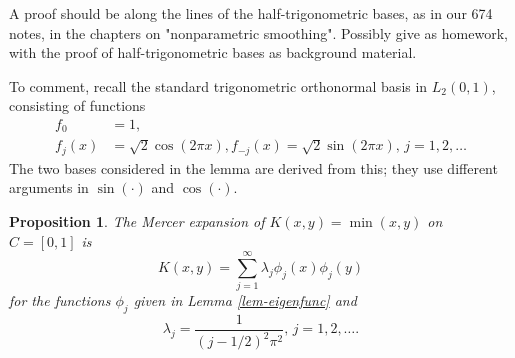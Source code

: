 \documentclass[11pt,twoside]{article}%
\theoremstyle{change}
\newtheorem{proposition}[theorem]{Proposition}
\newenvironment{quote-env}{\begin{quote}\sffamily }{\end{quote}}
\newenvironment{mycomments-env}[1][Mycomments]{\textbf{#1.} \begin{quote-env} }{ \end{quote-env}  \ \rule{0.5em}{0.5em}}
\begin{document}
\begin{mycomments}%


\begin{mycomments-env}
A proof should be along the lines of the half-trigonometric bases, as in our
674 notes, in the chapters on "nonparametric smoothing". Possibly give as
homework, with the proof of half-trigonometric bases as background material.
\end{mycomments-env}%

\end{mycomments}%


To comment, recall the standard trigonometric orthonormal basis in
$L_{2}(0,1)$, consisting of functions
\begin{align*}
f_{0}  & =1,\\
f_{j}(x)  & =\sqrt{2}\cos\left(  2\pi x\right)  ,f_{-j}(x)=\sqrt{2}\sin\left(
2\pi x\right)  \text{, }j=1,2,\ldots
\end{align*}
The two bases considered in the lemma are derived from this; they use
different arguments in $\sin(\cdot)$ and $\cos(\cdot)$.

\begin{proposition}
\label{prop-mercer-min-kernel}The Mercer expansion of $K\left(  x,y\right)
=\min(x,y)$ on $C=[0,1]$ is
\[
K(x,y)=\sum_{j=1}^{\infty}\lambda_{j}\phi_{j}(x)\phi_{j}(y)
\]
for the functions $\phi_{j}$ given in Lemma \ref{lem-eigenfunc} and
\[
\lambda_{j}=\frac{1}{\left(  j-1/2\right)  ^{2}\pi^{2}}\text{, }j=1,2,\ldots.
\]

\end{proposition}
\end{document}
